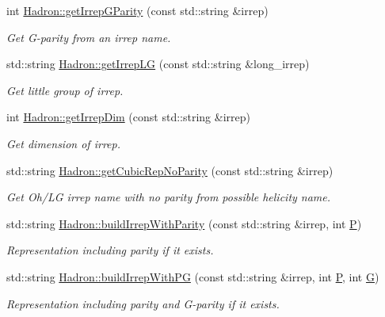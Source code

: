 \begin{DoxyCompactItemize}
int \mbox{\hyperlink{namespaceHadron_a951cfb9d3a3b24aaf558d2e22513cec1}{Hadron\+::get\+Irrep\+G\+Parity}} (const std\+::string \&irrep)
\begin{DoxyCompactList}\small\item\em Get G-\/parity from an irrep name. \end{DoxyCompactList}\item 
std\+::string \mbox{\hyperlink{namespaceHadron_a79373fb0ae210931217ae33dc98f5ee9}{Hadron\+::get\+Irrep\+LG}} (const std\+::string \&long\+\_\+irrep)
\begin{DoxyCompactList}\small\item\em Get little group of irrep. \end{DoxyCompactList}\item 
int \mbox{\hyperlink{namespaceHadron_a0451202d2f27c90c438c0d23da609c62}{Hadron\+::get\+Irrep\+Dim}} (const std\+::string \&irrep)
\begin{DoxyCompactList}\small\item\em Get dimension of irrep. \end{DoxyCompactList}\item 
std\+::string \mbox{\hyperlink{namespaceHadron_a6efae379facc253e72b35cf4d235dc88}{Hadron\+::get\+Cubic\+Rep\+No\+Parity}} (const std\+::string \&irrep)
\begin{DoxyCompactList}\small\item\em Get Oh/\+LG irrep name with no parity from possible helicity name. \end{DoxyCompactList}\item 
std\+::string \mbox{\hyperlink{namespaceHadron_a036614bb88af01a4308fe463a99f5b12}{Hadron\+::build\+Irrep\+With\+Parity}} (const std\+::string \&irrep, int \mbox{\hyperlink{adat__devel_2lib_2hadron_2operator__name__util_8cc_aef94be98e2c9e4a4dece75f60ca9792c}{P}})
\begin{DoxyCompactList}\small\item\em Representation including parity if it exists. \end{DoxyCompactList}\item 
std\+::string \mbox{\hyperlink{namespaceHadron_a45b2852ba4456b8729474ced77a3615f}{Hadron\+::build\+Irrep\+With\+PG}} (const std\+::string \&irrep, int \mbox{\hyperlink{adat__devel_2lib_2hadron_2operator__name__util_8cc_aef94be98e2c9e4a4dece75f60ca9792c}{P}}, int \mbox{\hyperlink{adat__devel_2lib_2hadron_2operator__name__util_8cc_ab8735735273b982cc3125e51fe46e2f4}{G}})
\begin{DoxyCompactList}\small\item\em Representation including parity and G-\/parity if it exists. \end{DoxyCompactList}\item 

\end{DoxyCompactItemize}
